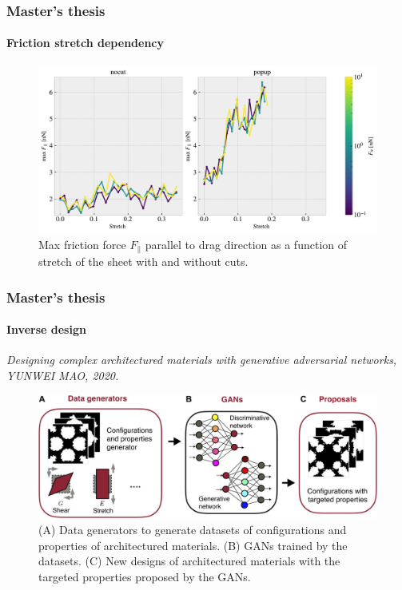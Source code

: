 \documentclass[
	10pt, %
]{beamer}
\begin{document}
\begin{frame}
	\frametitle{Master's thesis}
	\framesubtitle{Friction stretch dependency}
	\begin{figure}
		\includegraphics[width=\linewidth]{figures/multi_1.pdf}
		\caption{Max friction force $F_{\parallel}$ parallel to drag direction as a function of stretch of the sheet with and without cuts.}
	\end{figure}	
\end{frame}




\begin{frame}
	\frametitle{Master's thesis}
	\framesubtitle{Inverse design}
	\textit{Designing complex architectured materials with generative adversarial networks, YUNWEI MAO, 2020.}
	\begin{figure}
		\includegraphics[width=0.8\linewidth]{figures/ML_procedure.jpeg}
		\caption{(A) Data generators to generate datasets of configurations and properties of architectured materials. (B) GANs trained by the datasets. (C) New designs of architectured materials with the targeted properties proposed by the GANs.}
	\end{figure}
\end{frame}
\end{document}
